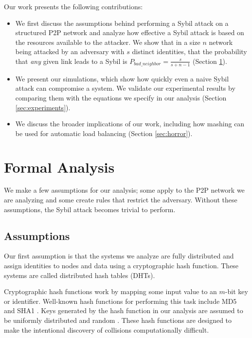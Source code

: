 \documentclass[11pt,conference]{IEEEtran}
\begin{document}
Our work presents the following contributions:
\begin{itemize}
    \item We first discuss the assumptions behind performing a Sybil attack on a structured P2P network and analyze how effective a Sybil attack is based on the resources available to the attacker.
    We show that in a size $n$ network being attacked by an adversary with $s$ distinct identities,  that the probability that \textit{any} given link leads to a Sybil is $P_{bad\_neighbor} =  \frac{s}{s+ n - 1}$ (Section \ref{sec:analysis}). 
    \item We present our simulations, which show how quickly even a naive Sybil attack can compromise a system. 
    We validate our experimental results by comparing them with the equations we specify in our analysis (Section \ref{sec:experiments}).
    \item We discuss the broader implications of our work, including how mashing can be used for automatic load balancing (Section \ref{sec:horror}).

\end{itemize}

\section{Formal Analysis}
\label{sec:analysis}

We make a few assumptions for our analysis; some apply to the P2P network we are analyzing and some create rules that restrict the adversary.
Without these assumptions, the Sybil attack becomes trivial to perform.



\subsection{Assumptions}
\label{sec:assume}

Our first assumption is that the systems we analyze are fully distributed and assign identities to nodes and data using a cryptographic hash function.
These systems are called distributed hash tables (DHTs).

Cryptographic hash functions work by mapping some input value to an $m$-bit key or identifier.
Well-known hash functions for performing this task include MD5 \cite{md5} and SHA1 \cite{sha1}.
Keys generated by the hash function in our analysis are assumed to be uniformly distributed and random \cite{bellare2004hash}. 
These hash functions are designed to make the intentional  discovery of collisions computationally difficult.
\end{document}
